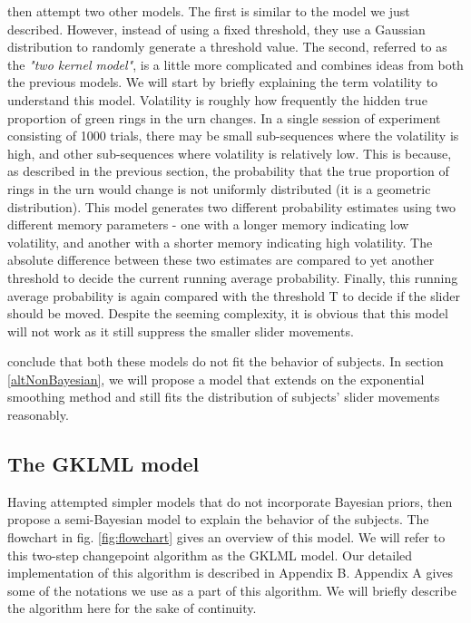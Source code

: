 \documentclass{article}
\begin{document}
\cite{gallistel2014perception} then attempt two other models. The first is similar to the model we just described. However, instead of using a fixed threshold, they use a Gaussian distribution to randomly generate a threshold value. The second, referred to as the \textit{"two kernel model"}, is a little more complicated and combines ideas from both the previous models. We will start by briefly explaining the term volatility to understand this model. Volatility is roughly how frequently the hidden true proportion of green rings in the urn changes. In a single session of experiment consisting of 1000 trials, there may be small sub-sequences where the volatility is high, and other sub-sequences where volatility is relatively low. This is because, as described in the previous section, the probability that the true proportion of rings in the urn would change is not uniformly distributed (it is a geometric distribution). This model generates two different probability estimates using two different memory parameters - one with a longer memory indicating low volatility, and another with a shorter memory indicating high volatility. The absolute difference between these two estimates are compared to yet another threshold to decide the current running average probability. Finally, this running average probability is again compared with the threshold T to decide if the slider should be moved. Despite the seeming complexity, it is obvious that this model will not work as it still suppress the smaller slider movements.

\cite{gallistel2014perception} conclude that both these models do not fit the behavior of subjects. In section \ref{altNonBayesian}, we will propose a model that extends on the exponential smoothing method and still fits the distribution of subjects' slider movements reasonably.

\subsection{The GKLML model}
Having attempted simpler models that do not incorporate Bayesian priors, \cite{gallistel2014perception} then propose a semi-Bayesian model to explain the behavior of the subjects. The flowchart in fig. \ref{fig:flowchart} gives an overview of this model. We will refer to this two-step changepoint algorithm as the GKLML model.  Our detailed implementation of this algorithm is described in Appendix B. Appendix A gives some of the notations we use as a part of this algorithm. We will briefly describe the algorithm here for the sake of continuity.
\end{document}
